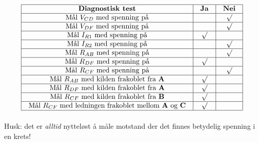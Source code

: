 
$$\vbox{\offinterlineskip
\halign{\strut
\vrule \quad\hfil # \ \hfil & 
\vrule \quad\hfil # \ \hfil & 
\vrule \quad\hfil # \ \hfil \vrule \cr
\noalign{\hrule}
%
{\bf Diagnostisk test} & {\bf Ja} & {\bf Nei} \cr
%
\noalign{\hrule}
%
Mål $V_{CD}$ med spenning på &  & $\surd$ \cr
%
\noalign{\hrule}
%
Mål $V_{DF}$ med spenning på &  & $\surd$ \cr
%
\noalign{\hrule}
%
Mål $I_{R1}$ med spenning på & $\surd$ &  \cr
%
\noalign{\hrule}
%
Mål $I_{R2}$ med spenning på &  & $\surd$ \cr
%
\noalign{\hrule}
%
Mål $R_{AB}$ med spenning på &  & $\surd$ \cr
%
\noalign{\hrule}
%
Mål $R_{DF}$ med spenning på & $\surd$ &  \cr
%
\noalign{\hrule}
%
Mål $R_{CF}$ med spenning på &  & $\surd$ \cr
%
\noalign{\hrule}
%
Mål $R_{AB}$ med kilden frakoblet fra {\bf A} & $\surd$ &  \cr
%
\noalign{\hrule}
%
Mål $R_{DF}$ med kilden frakoblet fra {\bf A} & $\surd$ &  \cr
%
\noalign{\hrule}
%
Mål $R_{CF}$ med kilden frakoblet fra {\bf B} & $\surd$ &  \cr
%
\noalign{\hrule}
%
Mål $R_{CF}$ med ledningen frakoblet mellom {\bf A} og {\bf C} & $\surd$ &  \cr
%
\noalign{\hrule}
} %
}$$ %

Husk: det er {\it alltid} nytteløst å måle motstand der det finnes betydelig spenning i en krets!










